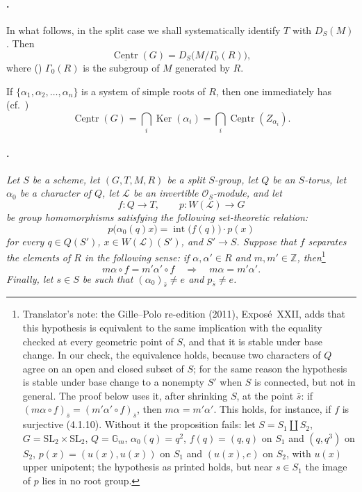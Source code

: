 \paragraph{.}
In what follows, in the split case we shall systematically identify
\(T\) with \(D_S(M)\). Then
\[
  \underline{\operatorname{Centr}}(G)
  =
  D_S\bigl(M/\Gamma_0(R)\bigr),
\]
where \textup{()} \(\Gamma_0(R)\) is the subgroup of \(M\)
generated by \(R\).
\par\noindent
If
\(\{\alpha_1,\alpha_2,\ldots,\alpha_n\}\) is a system of simple
roots of \(R\), then one immediately has
\textup{(cf.\ )}
\[
  \underline{\operatorname{Centr}}(G)
  =
  \bigcap_i\operatorname{Ker}(\alpha_i)
  =
  \bigcap_i\underline{\operatorname{Centr}}(Z_{\alpha_i}).
\]

\paragraph{.}
\textit{Let \(S\) be a scheme, let \((G,T,M,R)\) be a split
\(S\)-group, let \(Q\) be an \(S\)-torus, let \(\alpha_0\) be a
character of \(Q\), let \(\mathcal L\) be an invertible
\(\mathcal O_S\)-module, and let}
\[
  f:Q\longrightarrow T,
  \qquad
  p:W(\mathcal L)\longrightarrow G
\]
\textit{be group homomorphisms satisfying the following
set-theoretic relation:}
\[
  p\bigl(\alpha_0(q)x\bigr)
  =
  \operatorname{int}\bigl(f(q)\bigr)\mathbin{\cdot}p(x)
\]
\textit{for every \(q\in Q(S')\), \(x\in W(\mathcal L)(S')\), and
\(S'\to S\). Suppose that \(f\) separates the elements of \(R\) in
the following sense: if \(\alpha,\alpha'\in R\) and
\(m,m'\in\mathbb Z\), then}\footnote{Translator's note: the Gille--Polo re-edition (2011), Exposé~XXII, adds that
this hypothesis is equivalent to the same implication with the equality
checked at every geometric point of \(S\), and that it is stable under base
change. In our check, the equivalence holds, because two characters of \(Q\)
agree on an open and closed subset of \(S\); for the same reason the
hypothesis is stable under base change to a nonempty \(S'\) when \(S\) is
connected, but not in general. The proof below uses it, after shrinking
\(S\), at the point \(\bar s\): if
\((m\alpha\circ f)_{\bar s}=(m'\alpha'\circ f)_{\bar s}\), then
\(m\alpha=m'\alpha'\). This holds, for instance, if \(f\) is surjective
(4.1.10). Without it the proposition fails: let \(S=S_1\amalg S_2\),
\(G=\mathrm{SL}_2\times\mathrm{SL}_2\), \(Q=\mathbb G_m\),
\(\alpha_0(q)=q^2\), \(f(q)=(q,q)\) on \(S_1\) and \((q,q^3)\) on \(S_2\),
\(p(x)=(u(x),u(x))\) on \(S_1\) and \((u(x),e)\) on \(S_2\), with \(u(x)\)
upper unipotent; the hypothesis as printed holds, but near \(s\in S_1\) the
image of \(p\) lies in no root group.}
\[
  m\alpha\circ f=m'\alpha'\circ f
  \quad\Longrightarrow\quad
  m\alpha=m'\alpha'.
\]
\textit{Finally, let \(s\in S\) be such that
\((\alpha_0)_{\bar s}\ne e\) and \(p_{\bar s}\ne e\).}

